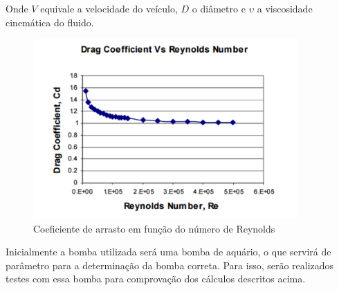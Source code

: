 \begin{description}
Onde $V$ equivale a velocidade do veículo, $D$ o diâmetro e $\upsilon$ a viscosidade
cinemática do fluido.
\par
\begin{figure}[h]
  \centering
  \includegraphics[width=0.9\textwidth]{figures/graphic-reynolds.png}
  \caption{Coeficiente de arrasto em função do número de Reynolds \cite{eng2008}}
  \label{fig:graphic-reynolds}
\end{figure}
\FloatBarrier
\par
Inicialmente a bomba utilizada será uma bomba de aquário, o que servirá de
parâmetro para a determinação da bomba correta. Para isso, serão realizados
testes com essa bomba para comprovação dos cálculos descritos acima.


\end{description}
